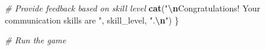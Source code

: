 \documentclass[
]{article}
\newenvironment{Shaded}{\begin{snugshade}}{\end{snugshade}}
\newcommand{\CommentTok}[1]{\textcolor[rgb]{0.56,0.35,0.01}{\textit{#1}}}
\newcommand{\FunctionTok}[1]{\textcolor[rgb]{0.13,0.29,0.53}{\textbf{#1}}}
\newcommand{\NormalTok}[1]{#1}
\newcommand{\SpecialCharTok}[1]{\textcolor[rgb]{0.81,0.36,0.00}{\textbf{#1}}}
\newcommand{\StringTok}[1]{\textcolor[rgb]{0.31,0.60,0.02}{#1}}
\begin{document}
\begin{Shaded}
\begin{Highlighting}[]
  \CommentTok{\# Provide feedback based on skill level}
  \FunctionTok{cat}\NormalTok{(}\StringTok{"}\SpecialCharTok{\textbackslash{}n}\StringTok{Congratulations! Your communication skills are "}\NormalTok{, skill\_level, }\StringTok{".}\SpecialCharTok{\textbackslash{}n}\StringTok{"}\NormalTok{)}
\NormalTok{\}}

\CommentTok{\# Run the game}
\end{Highlighting}
\end{Shaded}
\end{document}
